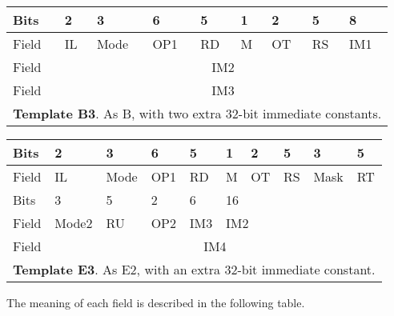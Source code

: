 \documentclass[forwardcom.tex]{subfiles}
\begin{document}
\begin{table}[h!] \label{table:templateB3}
\vv
\begin{tabular}{|p{10mm}|p{10mm}|p{10mm}|p{10mm}|p{10mm}|p{10mm}|p{10mm}|p{10mm}|p{24mm}|} \hline
 Bits & 2 & 3 & 6 & 5 & 1 & 2 & 5 & 8 \\ \hline
Field & IL & Mode & OP1 & RD & M & OT & RS & IM1 \\ \hline
Field & \multicolumn{8}{|c|}{ IM2 } \\ \hline
Field & \multicolumn{8}{|c|}{ IM3 } \\ \hline
\multicolumn{9}{|l|}{
\textbf{Template B3}. As B, with two extra 32-bit immediate constants.
} \\ \hline
\end{tabular}
\end{table}
\vspace{4mm}

\begin{table}[h!] \label{table:templateE3}
\vv
\begin{tabular}{|p{10mm}|p{10mm}|p{10mm}|p{10mm}|p{10mm}|p{10mm}|p{10mm}|p{10mm}|p{10mm}|p{10mm}|} \hline
Bits & 2 & 3 & 6 & 5 & 1 & 2 & 5 & 3 & 5 \\ \hline
Field & IL & Mode & OP1 & RD & M & OT & RS & Mask & RT  \\ \hline
Bits & 3 & 5 & 2 & 6 & \multicolumn{5}{l|}{ \hspace{29mm} 16  } \\ \hline
Field  & Mode2 & RU & OP2 & IM3 & \multicolumn{5}{l|}{ \hspace{28mm} IM2 } \\ \hline
Field & \multicolumn{9}{|c|}{ IM4 } \\ \hline
\multicolumn{10}{|l|}{
\textbf{Template E3}. As E2, with an extra 32-bit immediate constant.
} \\ \hline
\end{tabular}
\end{table}
\vspace{4mm}

The meaning of each field is described in the following table.

\pagebreak
\end{document}
